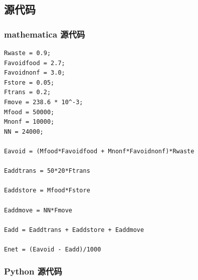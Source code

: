 \documentclass{article}
\begin{document}
\subsection*{源代码}
\subsubsection*{mathematica 源代码}
\begin{lstlisting}
Rwaste = 0.9;
Favoidfood = 2.7;
Favoidnonf = 3.0;
Fstore = 0.05;
Ftrans = 0.2;
Fmove = 238.6 * 10^-3;
Mfood = 50000;
Mnonf = 10000;
NN = 24000;

Eavoid = (Mfood*Favoidfood + Mnonf*Favoidnonf)*Rwaste

Eaddtrans = 50*20*Ftrans

Eaddstore = Mfood*Fstore

Eaddmove = NN*Fmove

Eadd = Eaddtrans + Eaddstore + Eaddmove

Enet = (Eavoid - Eadd)/1000
\end{lstlisting}

\subsubsection*{Python 源代码}

\end{document}
